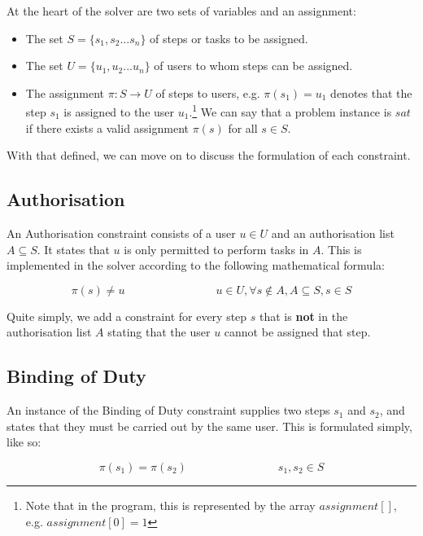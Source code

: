 \documentclass[11pt]{article}
\begin{document}
		At the heart of the solver are two sets of variables and an assignment:

		\begin{itemize}
			\item The set \(S = \{s_1, s_2... s_n\}\) of steps or tasks to be assigned.
			\item The set \(U = \{u_1, u_2... u_n\}\) of users to whom steps can be assigned.
			\item The assignment \(\pi : S \rightarrow U\) of steps to users, e.g. \(\pi(s_1) = u_1\) denotes that the step \(s_1\) is assigned to the user \(u_1\).\footnote{Note that in the program, this is represented by the array \(assignment[]\), e.g. \(assignment[0]=1\)} We can say that a problem instance is \(sat\) if there exists a valid assignment \(\pi(s)\) for all \(s \in S\).
		\end{itemize}

		With that defined, we can move on to discuss the formulation of each constraint.

		\subsection{Authorisation}

			An Authorisation constraint consists of a user \(u \in U\) and an authorisation list \(A \subseteq S\).
			It states that \(u\) is only permitted to perform tasks in \(A\).
			This is implemented in the solver according to the following mathematical formula:

			\begin{equation}
				\pi(s) \neq u \qquad \qquad \qquad \qquad u \in U, \forall s \notin A, A \subseteq S, s \in S
			\end{equation}

			Quite simply, we add a constraint for every step \(s\) that is \textbf{not} in the authorisation list \(A\)
			stating that the user \(u\) cannot be assigned that step.

		\subsection{Binding of Duty}

			An instance of the Binding of Duty constraint supplies two steps \(s_1\) and \(s_2\),
			and states that they must be carried out by the same user.
			This is formulated simply, like so:

			\begin{equation}
				\pi(s_1) = \pi(s_2) \qquad \qquad \qquad \qquad s_1, s_2 \in S
			\end{equation}
\end{document}
